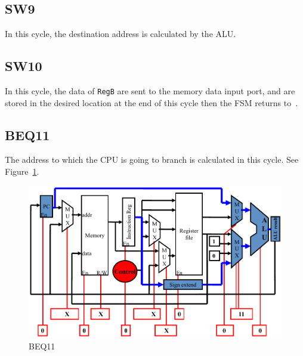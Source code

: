 \documentclass[a4paper]{article}
\begin{document}
\subsection{SW9}
In this cycle, the destination address is calculated by the ALU\@.

\subsection{SW10}
In this cycle, the data of \verb|RegB| are sent to the memory data input port, and are stored in the desired location at the end
of this cycle then the FSM returns to~.

\subsection{BEQ11}
The address to which the CPU is going to branch is calculated in this cycle. See Figure~\ref{fig:beq11}.
\begin{figure}[ht!]
    \center
    \includegraphics[scale=0.4]{beq11}
    \caption{BEQ11}\label{fig:beq11}
\end{figure}
\end{document}
